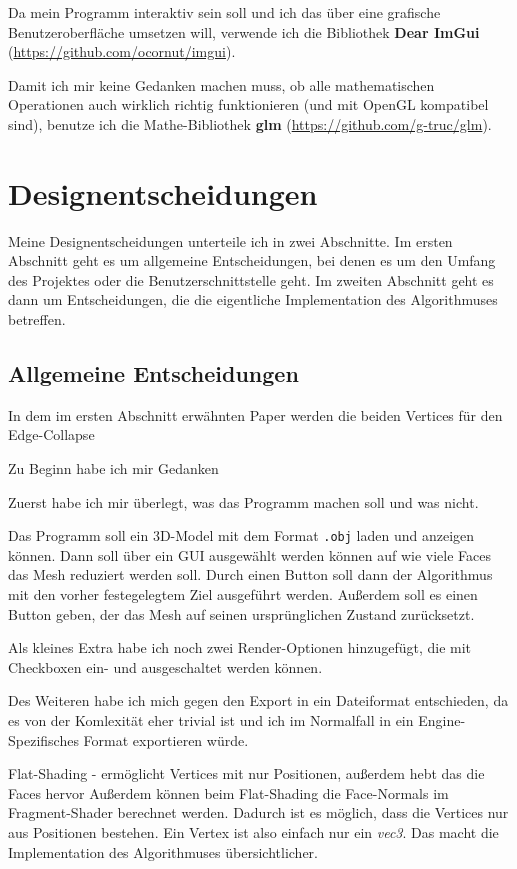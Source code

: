 \documentclass[a4paper,12pt]{book}
\begin{document}
Da mein Programm interaktiv sein soll und ich das über eine grafische Benutzeroberfläche umsetzen will, verwende ich die Bibliothek \textbf{Dear ImGui} (\url{https://github.com/ocornut/imgui}).

Damit ich mir keine Gedanken machen muss, ob alle mathematischen Operationen auch wirklich richtig funktionieren (und mit OpenGL kompatibel sind), benutze ich die Mathe-Bibliothek \textbf{glm} (\url{https://github.com/g-truc/glm}).

\section*{Designentscheidungen}

Meine Designentscheidungen unterteile ich in zwei Abschnitte. Im ersten Abschnitt geht es um allgemeine Entscheidungen, bei denen es um den Umfang des Projektes oder die Benutzerschnittstelle geht. Im zweiten Abschnitt geht es dann um Entscheidungen, die die eigentliche Implementation des Algorithmuses betreffen.

\subsection*{Allgemeine Entscheidungen}

In dem im ersten Abschnitt erwähnten Paper werden die beiden Vertices für den Edge-Collapse 

Zu Beginn habe ich mir Gedanken 

Zuerst habe ich mir überlegt, was das Programm machen soll und was nicht. 

Das Programm soll ein 3D-Model mit dem Format \texttt{.obj} laden und anzeigen können. Dann soll über ein GUI ausgewählt werden können auf wie viele Faces das Mesh reduziert werden soll. Durch einen Button soll dann der Algorithmus mit den vorher festegelegtem Ziel ausgeführt werden. Außerdem soll es einen Button geben, der das Mesh auf seinen ursprünglichen Zustand zurücksetzt.

Als kleines Extra habe ich noch zwei Render-Optionen hinzugefügt, die mit Checkboxen ein- und ausgeschaltet werden können.

Des Weiteren habe ich mich gegen den Export in ein Dateiformat entschieden, da es von der Komlexität eher trivial ist und ich im Normalfall in ein Engine-Spezifisches Format exportieren würde.

Flat-Shading - ermöglicht Vertices mit nur Positionen, außerdem hebt das die Faces hervor
Außerdem können beim Flat-Shading die Face-Normals im Fragment-Shader berechnet werden. Dadurch ist es möglich, dass die Vertices nur aus Positionen bestehen. Ein Vertex ist also einfach nur ein \emph{vec3}. Das macht die Implementation des Algorithmuses übersichtlicher.
\end{document}
